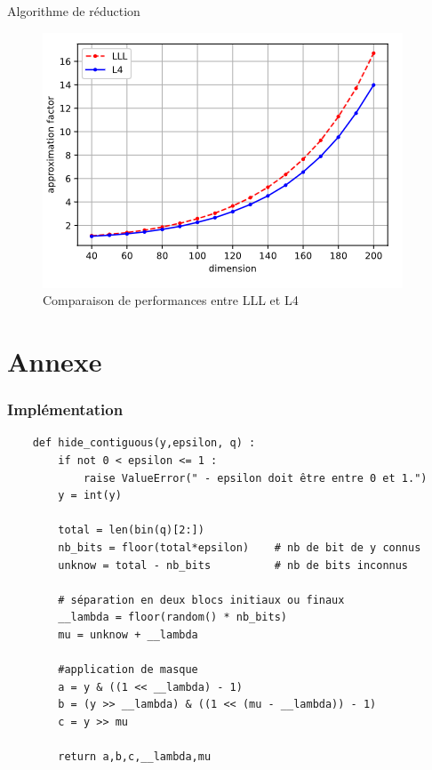 \documentclass{backend/backend}
\begin{document}
\begin{frame}{Algorithme de réduction}
    \begin{figure}
        \centering
        \includegraphics[width=0.5\linewidth]{img/annexe/LLL&L4.png}
        \caption{Comparaison de performances entre LLL et L4}
        \label{fig:L4}
    \end{figure}
\end{frame}

\section{Annexe}

\begin{frame}[fragile]
    \frametitle{Implémentation}
    \begin{verbatim}
    def hide_contiguous(y,epsilon, q) :
        if not 0 < epsilon <= 1 :
            raise ValueError(" - epsilon doit être entre 0 et 1.")
        y = int(y)
    
        total = len(bin(q)[2:])
        nb_bits = floor(total*epsilon)    # nb de bit de y connus
        unknow = total - nb_bits          # nb de bits inconnus
        
        # séparation en deux blocs initiaux ou finaux
        __lambda = floor(random() * nb_bits)
        mu = unknow + __lambda
        
        #application de masque
        a = y & ((1 << __lambda) - 1)
        b = (y >> __lambda) & ((1 << (mu - __lambda)) - 1)
        c = y >> mu
        
        return a,b,c,__lambda,mu
    \end{verbatim}
\end{frame}
\end{document}
